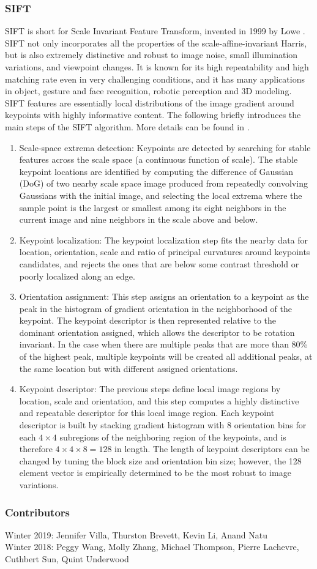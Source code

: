 \documentclass[twoside]{article}
\begin{document}
\subsubsection{SIFT}
SIFT is short for Scale Invariant Feature Transform, invented in 1999 by Lowe \cite{SIFT}. SIFT not only incorporates all the properties of the scale-affine-invariant Harris, but is also extremely distinctive and robust to image noise, small illumination variations, and viewpoint changes. It is known for its high repeatability and high matching rate even in very challenging conditions, and it has many applications in object, gesture and face recognition, robotic perception and 3D modeling. SIFT features are essentially local distributions of the image gradient around keypoints with highly informative content. The following briefly introduces the main steps of the SIFT algorithm. More details can be found in \cite{SIFT}.
\begin{enumerate}
\item Scale-space extrema detection: Keypoints are detected by searching for stable features across the scale space (a continuous function of scale). The stable keypoint locations are identified by computing the difference of Gaussian (DoG) of two nearby scale space image produced from repeatedly convolving Gaussians with the initial image, and selecting the local extrema where the sample point is the largest or smallest among its eight neighbors in the current image and nine neighbors in the scale above and below.
\item Keypoint localization: The keypoint localization step fits the nearby data for location, orientation, scale and ratio of principal curvatures around keypoints candidates, and rejects the ones that are below some contrast threshold or poorly localized along an edge.
\item Orientation assignment: This step assigns an orientation to a keypoint as the peak in the histogram of gradient orientation in the neighborhood of the keypoint. The keypoint descriptor is then represented relative to the dominant orientation assigned, which allows the descriptor to be rotation invariant. In the case when there are multiple peaks that are more than 80\% of the highest peak, multiple keypoints will be created all additional peaks, at the same location but with different assigned orientations.
\item Keypoint descriptor: The previous steps define local image regions by location, scale and orientation, and this step computes a highly distinctive and repeatable descriptor for this local image region. Each keypoint descriptor is built by stacking gradient histogram with 8 orientation bins for each $4\times 4 $ subregions of the neighboring region of the keypoints, and is therefore $4\times 4 \times 8 = 128$ in length. The length of keypoint descriptors can be changed by tuning the block size and orientation bin size; however, the 128 element vector is empirically determined to be the most robust to image variations.

\end{enumerate}



\subsubsection*{Contributors}
Winter 2019: Jennifer Villa, Thurston Brevett, Kevin Li, Anand Natu
\\
Winter 2018: Peggy Wang, Molly Zhang, Michael Thompson, Pierre Lachevre, Cuthbert Sun, Quint Underwood
\end{document}
